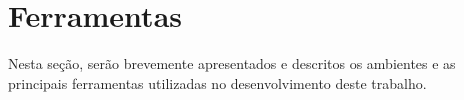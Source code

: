 





\section{Ferramentas}
\label{sec:tools}
Nesta seção, serão brevemente apresentados e descritos os ambientes e as principais ferramentas utilizadas no desenvolvimento deste trabalho.


